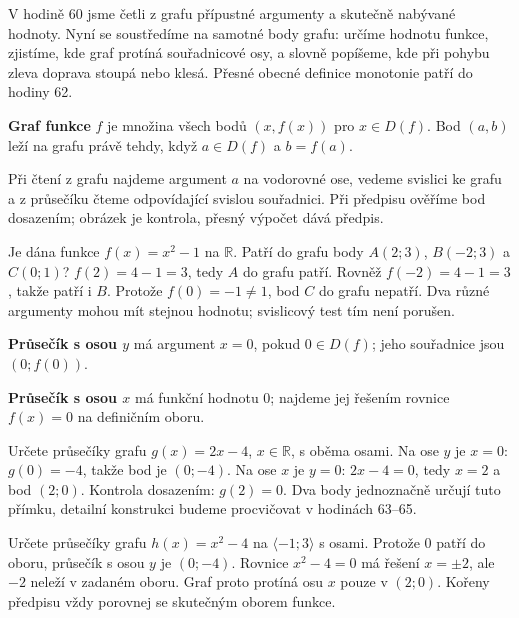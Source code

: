 \documentclass[11pt,a4paper]{article}
\begin{document}
V hodině 60 jsme četli z grafu přípustné argumenty a skutečně nabývané hodnoty. Nyní se soustředíme na samotné body grafu: určíme hodnotu funkce, zjistíme, kde graf protíná souřadnicové osy, a slovně popíšeme, kde při pohybu zleva doprava stoupá nebo klesá. Přesné obecné definice monotonie patří do hodiny 62.
\begin{definiceBox}
\textbf{Graf funkce} $f$ je množina všech bodů $(x,f(x))$ pro $x\in D(f)$. Bod $(a,b)$ leží na grafu právě tehdy, když $a\in D(f)$ a $b=f(a)$.
\end{definiceBox}
Při čtení z grafu najdeme argument $a$ na vodorovné ose, vedeme svislici ke grafu a z průsečíku čteme odpovídající svislou souřadnici. Při předpisu ověříme bod dosazením; obrázek je kontrola, přesný výpočet dává předpis.
\begin{prikladReseniBox}
Je dána funkce $f(x)=x^2-1$ na $\mathbb R$. Patří do grafu body $A(2;3)$, $B(-2;3)$ a $C(0;1)$?
\tcblower
$f(2)=4-1=3$, tedy $A$ do grafu patří. Rovněž $f(-2)=4-1=3$, takže patří i $B$. Protože $f(0)=-1\ne1$, bod $C$ do grafu nepatří. Dva různé argumenty mohou mít stejnou hodnotu; svislicový test tím není porušen.
\end{prikladReseniBox}
\begin{definiceBox}
\textbf{Průsečík s osou $y$} má argument $x=0$, pokud $0\in D(f)$; jeho souřadnice jsou $(0;f(0))$.
\end{definiceBox}
\begin{definiceBox}
\textbf{Průsečík s osou $x$} má funkční hodnotu $0$; najdeme jej řešením rovnice $f(x)=0$ na definičním oboru.
\end{definiceBox}
\begin{prikladReseniBox}
Určete průsečíky grafu $g(x)=2x-4$, $x\in\mathbb R$, s oběma osami.
\tcblower
Na ose $y$ je $x=0$: $g(0)=-4$, takže bod je $(0;-4)$. Na ose $x$ je $y=0$: $2x-4=0$, tedy $x=2$ a bod $(2;0)$. Kontrola dosazením: $g(2)=0$. Dva body jednoznačně určují tuto přímku, detailní konstrukci budeme procvičovat v hodinách 63–65.
\end{prikladReseniBox}
\begin{prikladReseniBox}
Určete průsečíky grafu $h(x)=x^2-4$ na $\langle-1;3\rangle$ s osami.
\tcblower
Protože $0$ patří do oboru, průsečík s osou $y$ je $(0;-4)$. Rovnice $x^2-4=0$ má řešení $x=\pm2$, ale $-2$ neleží v zadaném oboru. Graf proto protíná osu $x$ pouze v $(2;0)$. Kořeny předpisu vždy porovnej se skutečným oborem funkce.
\end{prikladReseniBox}
\end{document}
